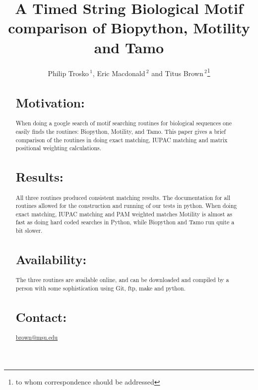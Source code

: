\documentclass{bioinfo}
\begin{document}

\title[short Title]{A Timed String Biological Motif comparison of Biopython, 
Motility and Tamo}
\author[Sample \textit{et~al}]{Philip Trosko\,$^{1}$, 
Eric Macdonald\,$^{2}$ 
and Titus Brown\,$^2$\footnote{to whom correspondence should be addressed}}
\address{$^{1}$Trosko's Consulting and Programming, 
1630 Sylvan Glen, Okemos, MI, 48864.\\
$^{2}$Department of Molecular Genetics, Michigan State University, 48823.}



\maketitle

\begin{abstract}

\section{Motivation:}
When doing a google search of motif searching routines for biological 
sequences one easily finds the routines: Biopython, Motility, and Tamo.  
This paper gives a brief comparison of the routines in doing exact matching, 
IUPAC matching and matrix positional weighting calculations.

\section{Results:}
All three routines produced consistent matching results.  
The documentation for all routines allowed for the construction and running of
our tests in python.
When doing exact matching, IUPAC matching and PAM weighted matches 
Motility is almost as fast as doing hard coded searches in Python, 
while Biopython and Tamo run quite a bit slower.  

\section{Availability:}
The three routines are available online, 
and can be downloaded and compiled by a person with some sophistication 
using Git, ftp, make and python.
\section{Contact:} \href{brown@msu.edu}{brown@msu.edu}
\end{abstract}
\end{document}
